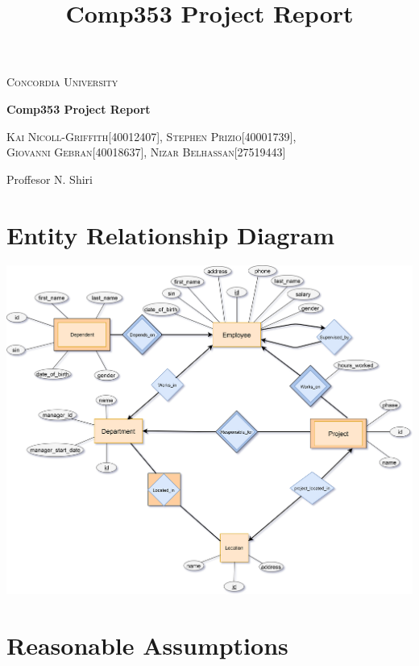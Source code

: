 \documentclass[fleqn, 11pt,letterpaper]{article}
\title{Comp353 Project Report}
\author{}
\begin{document}
	

	\begin{titlepage}
		\centering
		{\scshape\LARGE Concordia University \par}
		\vspace{1cm}
		{\scshape\Large \par}
		\vspace{1.5cm}
		{\huge\bfseries Comp353 Project Report\par}
		\vspace{2cm}
		{\Large\scshape Kai Nicoll-Griffith[40012407], Stephen Prizio[40001739], \\Giovanni Gebran[40018637], Nizar Belhassan[27519443]\par}
		\vspace{2cm}{\Large	Team kzc353\_4\par}
		\vspace{3cm}
		{Proffesor N. Shiri\par}
	\end{titlepage}

	\section{Entity Relationship Diagram}
			\newcommand{\graphicwidth}{18.5cm}
\hspace*{-1.1cm}\includegraphics[width=\graphicwidth]{erd.png}

\pagebreak

	\section{Reasonable Assumptions}
\end{document}
